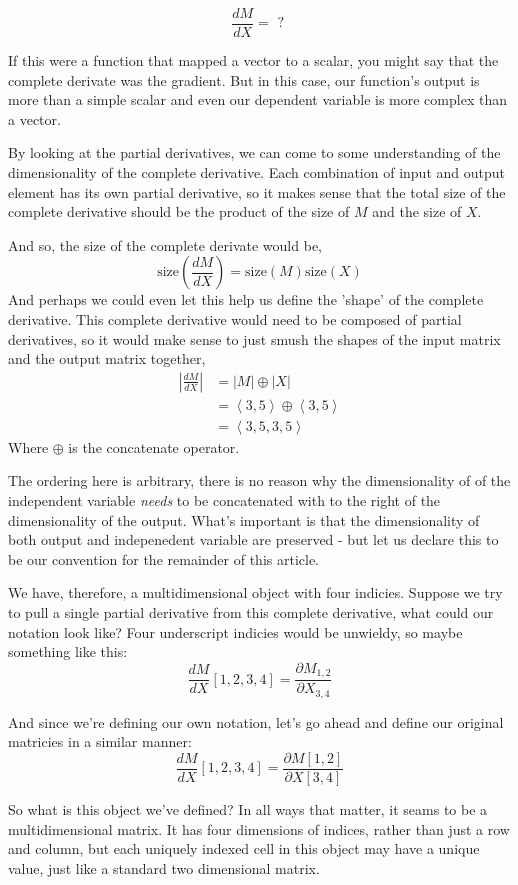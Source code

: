 \documentclass[12pt]{article}
\theoremstyle{definition}
\theoremstyle{case}
\theoremstyle{ppart}
\begin{document}
\[\frac{dM}{dX} = \mbox{ ? }\]

If this were a function that mapped a vector to a scalar, you might say that the
complete derivate was the gradient. But in this case, our function's output is more
than a simple scalar and even our dependent variable is more complex than a vector.

By looking at the partial derivatives, we can come to some understanding of the
dimensionality of the complete derivative. Each combination of input and output
element has its own partial derivative, so it makes sense that the total size
of the complete derivative should be the product of the size of $M$ and the size
of $X$.

And so, the size of the complete derivate would be,
\[
\mbox{size}\left(\frac{dM}{dX}\right) = \mbox{size}(M) \mbox{size}(X)
\]
And perhaps we could even let this help us define the 'shape' of the complete
derivative. This complete derivative would need to be composed of partial
derivatives, so it would make sense to just smush the shapes of the input
matrix and the output matrix together,
\begin{align*}
\left|\frac{dM}{dX}\right| &= |M| \oplus |X| \\
 &= \left< 3, 5 \right> \oplus \left< 3, 5 \right> \\
 &= \left< 3, 5, 3, 5 \right>
\end{align*}
Where $\oplus$ is the concatenate operator.

The ordering here is arbitrary, there is no reason why the dimensionality of
of the independent variable \textit{needs} to be concatenated with to the right of the
dimensionality of the output. What's important is that the dimensionality of
both output and indepenedent variable are preserved - but let us declare this to
be our convention for the remainder of this article.

We have, therefore, a multidimensional object with four indicies. Suppose we try to
pull a single partial derivative from this complete derivative, what could our
notation look like? Four underscript indicies would be unwieldy, so maybe something
like this:
\[
\frac{dM}{dX}[1,2,3,4] = \frac{\partial M_{1,2}}{\partial X_{3,4}}
\]

And since we're defining our own notation, let's go ahead and define our original
matricies in a similar manner:
\[
\frac{dM}{dX}[1,2,3,4] = \frac{\partial M[1,2]}{\partial X[3,4]}
\]

So what is this object we've defined? In all ways that matter, it seams to be
a multidimensional matrix. It has four dimensions of indices, rather than just
a row and column, but each uniquely indexed cell in this object may have a
unique value, just like a standard two dimensional matrix.
\end{document}
